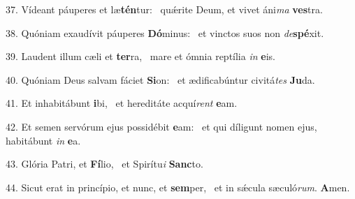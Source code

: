 37. Vídeant páuperes et læ\textbf{tén}tur: \ast\  quǽrite Deum, et vivet áni\textit{ma} \textbf{ves}tra.\

38. Quóniam exaudívit páuperes \textbf{Dó}minus: \ast\  et vinctos suos non \textit{de}\textbf{spé}xit.\

39. Laudent illum cæli et \textbf{ter}ra, \ast\  mare et ómnia reptília \textit{in} \textbf{e}is.\

40. Quóniam Deus salvam fáciet \textbf{Si}on: \ast\  et ædificabúntur civitá\textit{tes} \textbf{Ju}da.\

41. Et inhabitábunt \textbf{i}bi, \ast\  et hereditáte acquí\textit{rent} \textbf{e}am.\

42. Et semen servórum ejus possidébit \textbf{e}am: \ast\  et qui díligunt nomen ejus, habitábunt \textit{in} \textbf{e}a.\

43. Glória Patri, et \textbf{Fí}lio, \ast\  et Spirítu\textit{i} \textbf{Sanc}to.\

44. Sicut erat in princípio, et nunc, et \textbf{sem}per, \ast\  et in sǽcula sæculó\textit{rum}. \textbf{A}men.\

